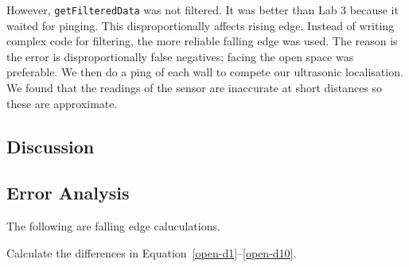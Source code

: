 \documentclass[twocolumn]{article}
\begin{document}
However, {\tt getFilteredData} was not filtered. It was better than Lab 3\cite{alexneil3} because it waited for pinging. This disproportionally affects rising edge. Instead of writing complex code for filtering, the more reliable falling edge was used. The reason is the error is disproportionally false negatives; facing the open space was preferable. We then do a ping of each wall to compete our ultrasonic localisation. We found that the readings of the sensor are inaccurate at short distances so these are approximate.

\cite{lab4}

\subsection{Discussion}

\subsection{Error Analysis}

The following are falling edge caluculations.

Calculate the differences in Equation~\ref{open-d1}--\ref{open-d10}.
\end{document}
